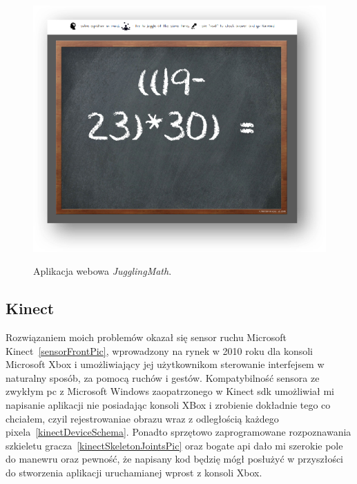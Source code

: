 \begin{figure}[h]
    \caption{Aplikacja webowa \textit{JugglingMath}.}
    \centering
    \includegraphics[width=5.1614in]{graphics/webapp_jm.png}
    \label{webappJugglingMathScreenshot}
\end{figure}

\subsection{Kinect}


    \newline
    \akapit
    Rozwiązaniem moich problemów okazał się sensor ruchu Microsoft
    Kinect{\textregistered}~\ref{sensorFrontPic},
    wprowadzony na rynek w 2010 roku
    dla konsoli Microsoft Xbox{\textregistered} i
    umożliwiający jej użytkownikom
    sterowanie interfejsem w naturalny sposób, za pomocą ruchów i gestów.
    Kompatybilność sensora ze zwykłym \acrshort{pc} z Microsoft
    Windows{\textregistered} zaopatrzonego w Kinect \acrshort{sdk} umożliwiał mi
    napisanie aplikacji nie posiadając konsoli XBox i zrobienie
    dokładnie tego co chciałem, czyil rejestrowaniae obrazu
    wraz z odległością każdego pixela~\ref{kinectDeviceSchema}.
    Ponadto sprzętowo zaprogramowane rozpoznawania
    szkieletu  gracza~\ref{kinectSkeletonJointsPic}
    oraz bogate \acrshort{api} dało mi szerokie pole do manewru oraz pewność,
    że napisany kod będzię mógł posłużyć w przyszłości do stworzenia
    aplikacji uruchamianej wprost z konsoli Xbox.


